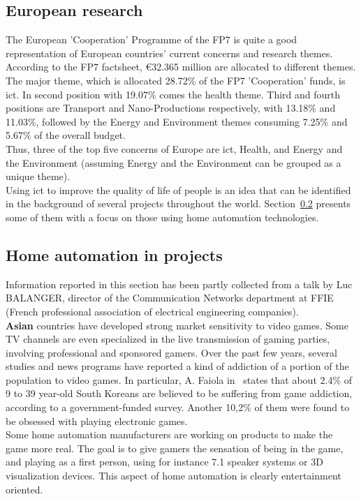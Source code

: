 \subsection{European research}
The European 'Cooperation' Programme of the FP7 is quite a good representation of European countries' current concerns and research themes. According to the FP7 factsheet\cite{fp7-factsheets}, €32.365 million are allocated to different themes. The major theme, which is allocated 28.72\% of the FP7 'Cooperation' funds, is \gls{ict}. In second position with 19.07\% comes the health theme. Third and fourth positions are Transport and Nano-Productions respectively, with 13.18\% and 11.03\%, followed by the Energy and Environment themes consuming 7.25\% and 5.67\% of the overall budget.\\
Thus, three of the top five concerns of Europe are \gls{ict}, Health, and Energy and the Environment (assuming Energy and the Environment can be grouped as a unique theme).\\

Using \gls{ict} to improve the quality of life of people is an idea that can be identified in the background of several projects throughout the world. Section~\ref{sec:homeautomation.projects} presents some of them with a focus on those using home automation technologies.

\subsection{Home automation in projects}
\label{sec:homeautomation.projects}

Information reported in this section has been partly collected from a talk by Luc BALANGER, director of the Communication Networks department at FFIE (French professional association of electrical engineering companies).\\

{\bf Asian} countries have developed strong market sensitivity to video games. Some TV channels are even specialized in the live transmission of gaming parties, involving professional and sponsored gamers. Over the past few years, several studies and news programs have reported a kind of addiction of a portion of the  population to video games. In particular, A. Faiola in~\cite{Faiola:2006} states that about 2.4\% of 9 to 39 year-old South Koreans are believed to be suffering from game addiction, according to a government-funded survey. Another 10,2\% of them were found to be obsessed with playing electronic games.\\
Some home automation manufacturers are working on products to make the game more real. The goal is to give gamers the sensation of being in the game, and playing as a first person, using for instance 7.1 speaker systems or 3D visualization devices. This aspect of home automation is clearly entertainment oriented.\\

